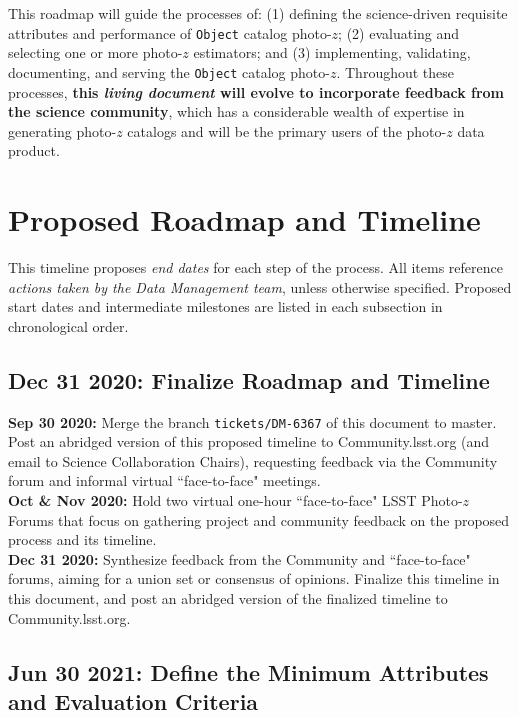 \documentclass[DM,lsstdraft,toc]{lsstdoc}
\begin{document}
This roadmap will guide the processes of: (1) defining the science-driven requisite attributes and performance of {\tt Object} catalog photo-$z$; (2) evaluating and selecting one or more photo-$z$ estimators; and (3) implementing, validating, documenting, and serving the {\tt Object} catalog photo-$z$. 
Throughout these processes, \textbf{this \textit{living document} will evolve to incorporate feedback from the science community}, which has a considerable wealth of expertise in generating photo-$z$ catalogs and will be the primary users of the photo-$z$ data product.


\clearpage
\section{Proposed Roadmap and Timeline}\label{sec:time}

This timeline proposes {\it end dates} for each step of the process.
All items reference {\it actions taken by the Data Management team}, unless otherwise specified. 
Proposed start dates and intermediate milestones are listed in each subsection in chronological order.

\subsection{Dec 31 2020: Finalize Roadmap and Timeline}\label{ssec:time_time}

{\bf Sep 30 2020:} Merge the branch {\tt tickets/DM-6367} of this document to master. Post an abridged version of this proposed timeline to Community.lsst.org (and email to Science Collaboration Chairs), requesting feedback via the Community forum and informal virtual ``face-to-face" meetings. \\
{\bf Oct \& Nov 2020:} Hold two virtual one-hour ``face-to-face" LSST Photo-$z$ Forums that focus on gathering project and community feedback on the proposed process and its timeline. \\
{\bf Dec 31 2020:} Synthesize feedback from the Community and ``face-to-face" forums, aiming for a union set or consensus of opinions. Finalize this timeline in this document, and post an abridged version of the finalized timeline to Community.lsst.org.

\subsection{Jun 30 2021: Define the Minimum Attributes and Evaluation Criteria}\label{ssec:time_mvp}
\end{document}
